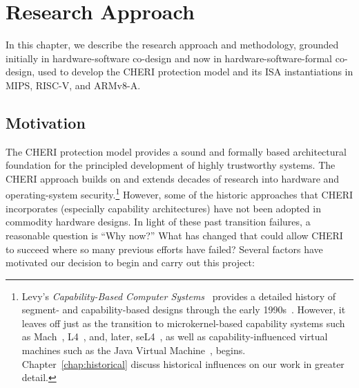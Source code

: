 \chapter{Research Approach}
\label{chap:research}

In this chapter, we describe the research approach and methodology, grounded
initially in hardware-software co-design and now in
hardware-software-formal co-design, used to develop the CHERI protection model and its ISA instantiations in MIPS, RISC-V, and ARMv8-A.

\section{Motivation}

The CHERI protection model provides a sound and formally based architectural
foundation for the principled development of highly
trustworthy systems.
The CHERI approach builds on and extends decades of research into hardware and
operating-system security.\footnote{Levy's {\em Capability-Based Computer Systems}~\cite{levy:capabilities} provides a
detailed history of segment- and capability-based designs through the early
1990s~\cite{levy:capabilities}.
However, it leaves off just as the transition to microkernel-based capability systems such as
Mach~\cite{accetta:mach}, L4~\cite{liedtke:l4}, and, later, seL4~\cite{klein:sel4}, as
well as capability-influenced virtual machines such as the Java Virtual Machine~\cite{Gong99},
begins.
Chapter~\ref{chap:historical} discuss historical influences on our work in greater detail.}
However, some of the historic approaches that CHERI incorporates (especially capability architectures)
have not been adopted in commodity hardware designs.
In light of these past transition failures, a reasonable question
is ``Why now?''
What has changed that could allow CHERI to succeed where
so many previous efforts have failed?
Several factors have motivated our decision to begin and carry out this project:

